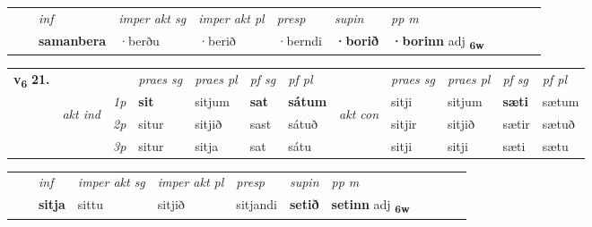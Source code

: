 \begin{tabular}{llllllllllll}
 & & \textit{inf} & \textit{imper akt sg} & \textit{imper akt pl}   & \textit{presp} & \textit{supin}  & \textit{pp m}     \\*
  & & \textbf{samanbera} & ·berðu  & ·berið   & ·berndi &  \textbf{·borið}  & \textbf{·borinn} adj \textbf{\textsubscript{6w}} \\*
\cmidrule{1-12}
\end{tabular}



\begin{tabular}{llllllllllll} \toprule
\multirow{4}{*}{{{\textbf{v{\textsubscript{6}}} \Large{\textbf{21.}}}}}  & &   &  \textit{praes sg}  & \textit{praes pl}  &\textit{ pf sg} & \textit{pf pl} &  &  \textit{praes sg}  & \textit{praes pl}  & \textit{pf sg} & \textit{pf pl } \\*
	\cmidrule{4-7} \cmidrule{9-12}
 & \multirow{3}{*}{\begin{turn}{90}\textit{akt ind}\end{turn}} & {\textit{1p}} & \textbf{sit} & sitjum    & \textbf{sat} & \textbf{sátum} & \multirow{3}{*}{\begin{turn}{90}\textit{akt con}\end{turn}} &sitji & sitjum & \textbf{sæti} & sætum\\*
& &  {\textit{2p}} &  situr  & sitjið   & sast & sátuð & & sitjir & sitjið & sætir & sætuð \\*
& &  {\textit{3p}} & situr & sitja   & sat & sátu & & sitji & sitji& sæti & sætu  \\*
\cmidrule{4-7} \cmidrule{9-12}
\end{tabular}


\begin{tabular}{llllllllllll}
 & & \textit{inf} & \textit{imper akt sg} & \textit{imper akt pl}   & \textit{presp} & \textit{supin}  & \textit{pp m}     \\*
  & & \textbf{sitja} & sittu  & sitjið   & sitjandi &  \textbf{setið}  & \textbf{setinn} adj \textbf{\textsubscript{6w}} \\*
\cmidrule{1-12}
\end{tabular}



